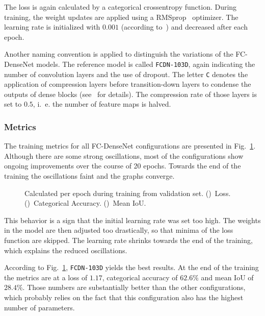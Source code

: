 The loss is again calculated by a categorical crossentropy function. During training, the weight updates are applied using a RMSprop~\cite{rmsprop14} optimizer. The learning rate is initialized with $0.001$ (according to~\cite{denseseg17}) and decreased after each epoch.

Another naming convention is applied to distinguish the variations of the FC-DenseNet models. The reference model is called \texttt{FCDN-103D}, again indicating the number of convolution layers and the use of dropout. The letter \texttt{C} denotes the application of compression layers before transition-down layers to condense the outputs of dense blocks (see~\cite{denseseg17} for details). The compression rate of those layers is set to $0.5$, i.~e. the number of feature maps is halved.

\subsubsection{Metrics}
The training metrics for all FC-DenseNet configurations are presented in Fig.~\ref{fig:densenet_train_metrics}. Although there are some strong oscillations, most of the configurations show ongoing improvements over the course of 20 epochs. Towards the end of the training the oscillations faint and the graphs converge.

\begin{figure}[h]
    \newcommand{\DensenetMetricsImageWidth}{0.32\textwidth}
    \centering
            
    \caption[Metrics of FC-DenseNet Configurations]
    {Calculated per epoch during training from validation set. ()~Loss. ()~Categorical Accuracy. ()~Mean IoU.}
    \label{fig:densenet_train_metrics}
\end{figure}

This behavior is a sign that the initial learning rate was set too high. The weights in the model are then adjusted too drastically, so that minima of the loss function are skipped. The learning rate shrinks towards the end of the training, which explains the reduced oscillations.

According to Fig.~\ref{fig:densenet_train_metrics}, \texttt{FCDN-103D} yields the best results. At the end of the training the metrics are at a loss of $1.17$, categorical accuracy of $62.6\%$ and mean IoU of $28.4\%$. Those numbers are substantially better than the other configurations, which probably relies on the fact that this configuration also has the highest number of parameters.

